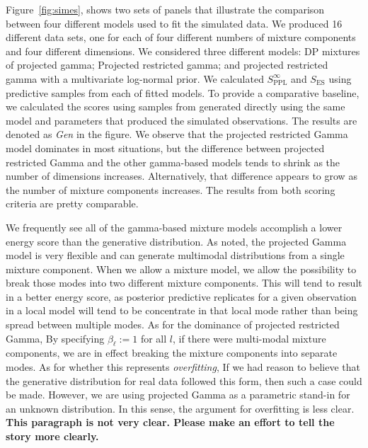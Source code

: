 Figure~\ref{fig:simes}, shows two sets of panels that illustrate the comparison
between four different models used to fit the simulated data. We produced 16 
different data sets, one for each of four different numbers of mixture components 
and four different dimensions. We considered three different models: DP mixtures 
of projected gamma; Projected restricted gamma; and projected restricted gamma 
with a multivariate log-normal prior. We calculated $S^\infty_{\text{PPL}}$ and 
$S_{\text{ES}}$ using predictive samples from each of fitted models. To provide 
a comparative baseline, we calculated the scores using samples from generated 
directly using the same model and parameters that produced the simulated 
observations. The results are denoted as \emph{Gen} in the figure. 
We observe that the projected
  restricted Gamma model dominates in most situations, but the difference between projected restricted
  Gamma and the other gamma-based models tends to shrink as the number of dimensions increases.
  Alternatively, that difference appears to grow as the number of mixture components increases. The results from both scoring criteria are pretty comparable.


We frequently see all of the gamma-based mixture models accomplish a lower energy score than the generative
  distribution.  As \cite{nunez2019} noted, the projected Gamma model is very flexible and can generate
  multimodal distributions from a single mixture component.  When we allow a mixture model, we allow
  the possibility to break those modes into two different mixture components.  This will tend to
  result in a better energy score, as posterior predictive replicates for a given observation in a local
  model will tend to be concentrate in that local mode rather than being spread between multiple
  modes.  As for the dominance of projected restricted Gamma, By specifying $\beta_{\ell} := 1$ for all
  $l$, if there were multi-modal mixture components, we are in effect breaking the mixture components
  into separate modes. As for whether this represents \emph{overfitting}, If we had reason to
  believe that the generative distribution for real data followed this form, then such a case could
  be made.  However, we are using projected Gamma as a parametric stand-in for an unknown distribution.
  In this sense, the argument for overfitting is less clear.
  {\bf This paragraph is not very clear. Please make an effort to tell the story more clearly.}

